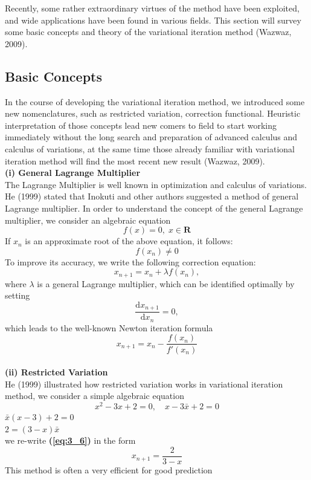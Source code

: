 \documentclass[12pt]{report}
\newcommand{\NI}{\noindent}
\newcommand{\bt}[1]{\textbf{#1}}
\newcommand{\refn}[1]{\bt{(\ref{#1})}}
\begin{document}
Recently, some rather extraordinary virtues of the method have been exploited, and wide applications have been found in various fields. This section will survey some basic concepts and theory of the variational iteration method (Wazwaz, 2009).

\subsection{Basic Concepts}
In the course of developing the variational iteration method, we introduced some new nomenclatures, such as restricted variation, correction functional. Heuristic interpretation of those concepts lead new comers to field to start working immediately without the long search and preparation of advanced calculus and calculus of variations, at the same time those already familiar with variational iteration method will find the most recent new result (Wazwaz, 2009).\\

\NI\textbf{(i) General Lagrange Multiplier}\\
The Lagrange Multiplier is well known in optimization and calculus of variations. He (1999) stated that Inokuti and other authors suggested a method of general Lagrange  multiplier. In order to understand the concept of the general Lagrange multiplier, we consider an algebraic equation
\begin{equation}
	f(x) = 0, \; x \in \mathbf{R}
\end{equation}
If $x_n$ is an approximate root of the above equation, it follows: 
\begin{equation}
	f(x_n) \neq 0
\end{equation}
To improve its accuracy, we write the following correction equation:
\begin{equation}
	x_{n+1} = x_n + \lambda f(x_n),
\end{equation}
where $\lambda$ is a general Lagrange multiplier, which can be identified optimally by setting 
\begin{equation}
	\frac{\text{d}x_{n+1}}{\text{d}x_n}=0,
\end{equation}
which leads to the well-known Newton iteration formula
\begin{equation}
	x_{n+1} = x_n - \frac{f(x_n)}{f'(x_n)}
\end{equation}
\\
\NI\textbf{(ii) Restricted Variation}\\
He (1999) illustrated how restricted variation works in variational iteration method, we consider a simple algebraic equation
\begin{equation}
		x^2 - 3x + 2 = 0,\quad  x-3\bar{x}+2=0\label{eq:3_6}
\end{equation}
$\bar{x}(x-3)+2=0$\\
$2=(3-x)\bar{x}$\\
we re-write \refn{eq:3_6} in the form
\begin{equation}
	x_{n+1} = \frac{2}{3-x}
\end{equation}
This method is often a very efficient for good prediction\\
\end{document}

